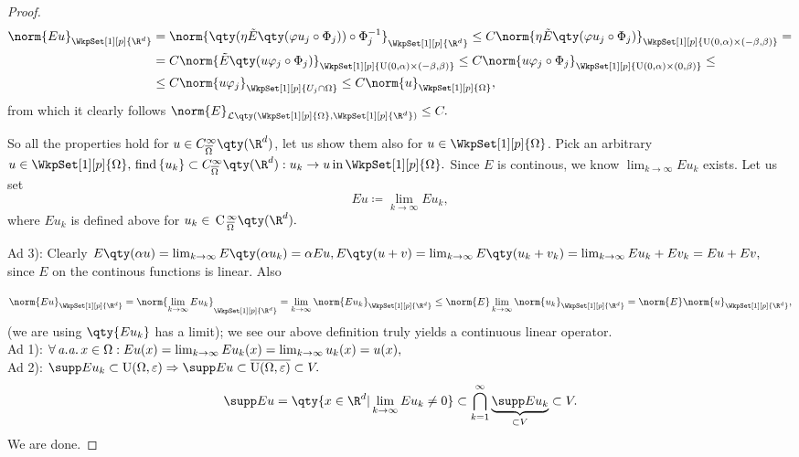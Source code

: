 \begin{proof}
\begin{align*}
\norm{Eu}_{\WkpSet[1][p]{\R^{d}}} &= \norm{\qty(\eta \tilde{E}\qty(\varphi u_j \circ \Phi_j))\circ \Phi_j^{-1}}_{\WkpSet[1][p]{\R^{d}}} \leq C\norm{\eta \tilde{E} \qty(\varphi u_j \circ \Phi_j)}_{\WkpSet[1][p]{\text{U}(0,\alpha)\times (-\beta,\beta)}} = \\
				  &= C \norm{\tilde{E}\qty(u \varphi_j \circ \Phi_j)}_{\WkpSet[1][p]{\text{U}(0,\alpha)\times (-\beta, \beta)}} \leq C \norm{u \varphi_j \circ \Phi_j}_{\WkpSet[1][p]{\text{U}(0,\alpha)\times (0,\beta)}} \leq \\
				  &\leq C \norm{u \varphi_j}_{\WkpSet[1][p]{U_j \cap \Omega}} \leq C \norm{u}_{\WkpSet[1][p]{\Omega}},
\end{align*}
from which it clearly follows $\norm{E}_{\mathcal{L}\qty(\WkpSet[1][p]{\Omega}, \WkpSet[1][p]{\R^d})} \leq C.$

	So all the properties hold for $u \in C^{\infty}_{\overline{\Omega}}\qty(\R^d)$, let us show them also for $u \in \WkpSet[1][p]{\Omega}$.
	Pick an arbitrary $u \in \WkpSet[1][p]{\Omega}, \, \text{find} \, \{u_k\} \subset C^{\infty}_{\overline{\Omega}}\qty(\R^d): u_k \to u \, \text{in} \, \WkpSet[1][p]{\Omega}.$ Since $E$ is continous, we know $\lim_{k\to \infty}E u_k$ exists. Let us set
	\[
		E u \coloneq \lim_{k\to \infty}E u_k,
	\]
	where $Eu_k$ is defined above for $u_k \in \, \text{C} \,^{\infty}_{\overline{\Omega}}\qty(\R^{d}).$

	Ad 3): Clearly $E \qty(\alpha u) = \lim_{k \to \infty}E \qty(\alpha u_k) = \alpha E u, E \qty(u + v) = \lim_{k\to \infty}E\qty(u_k + v_k) = \lim_{k \to \infty}Eu_k + Ev_k = Eu + Ev,$ since $E$ on the continous functions is linear. Also


	\[
		\norm{Eu}_{\WkpSet[1][p]{\R^{d}}} = \norm{\lim_{k\to \infty}E u_k}_{\WkpSet[1][p]{\R^{d}}} = \lim_{k\to \infty} \norm{E u_k}_{\WkpSet[1][p]{\R^{d}}} \leq \norm{E} \lim_{k\to \infty}\norm{u_k}_{\WkpSet[1][p]{\R^{d}}} = \norm{E} \norm{u}_{\WkpSet[1][p]{\R^{d}}},
	\]
	(we are using $\qty{E u_k}$ has a limit); we see our above definition truly yields a continuous linear operator.\\
	Ad 1): $\forall \, \text{\textit{a.a.}} \, x \in \Omega: Eu(x) = \lim_{k\to \infty}Eu_k(x) = \lim_{k \to \infty}u_k(x) = u(x),$\\
	Ad 2): $\supp Eu_k \subset \text{U}(\Omega,\varepsilon) \Rightarrow \supp Eu \subset \overline{\text{U}(\Omega,\varepsilon)} \subset V.$
	\[
		\supp Eu = \qty{x \in \R^{d}| \lim_{k\to \infty}Eu_k \neq 0}\subset \bigcap_{k=1}^{\infty}\underbrace{\supp Eu_k}_{\subset V} \subset V.
	\]
	We are done.

\end{proof}

